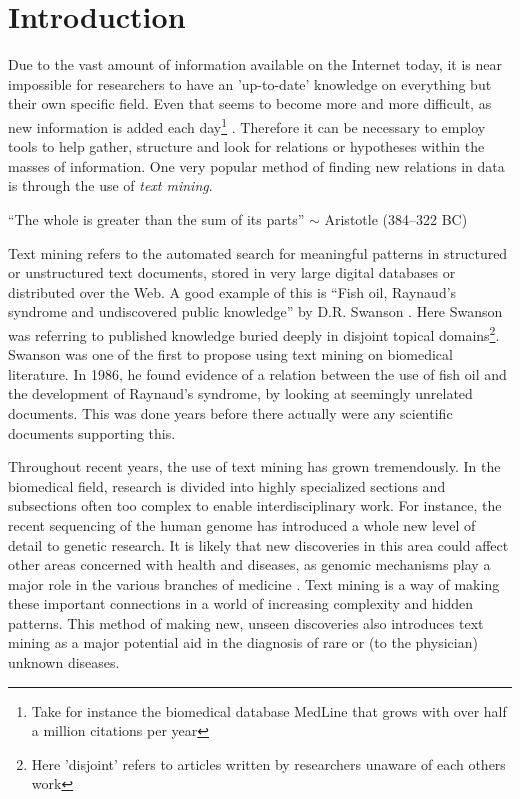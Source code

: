 \chapter{Introduction\label{Introduction}}

Due to the vast amount of information available on the Internet today,
it is near impossible for researchers to have an 'up-to-date'
knowledge on everything but their own specific field. Even that seems
to become more and more difficult, as new information is added each
day\footnote{Take for instance the biomedical database MedLine that
  grows with over half a million citations per year}
\cite{CitAddMedLine}. Therefore it can be necessary to employ tools to
help gather, structure and look for relations or hypotheses within the
masses of information. One very popular method of finding new relations in
data is through the use of \textit{text mining}.

\begin{center}
{\small``The whole is greater than the sum of its parts'' $\sim$ Aristotle
(384--322 BC)} 
\end{center}

Text mining refers to the automated search for meaningful patterns in
structured or unstructured text documents, stored in very large digital
databases or distributed over the Web. A good example of this is
``Fish oil, Raynaud's syndrome and undiscovered public knowledge'' by
D.R. Swanson \cite{DRSwanson}. Here Swanson was referring to published
knowledge buried deeply in disjoint topical domains\footnote{Here
  'disjoint' refers to articles written by researchers unaware of each
  others work}. Swanson was one of the first to propose using text
mining on biomedical literature. In 1986, he found evidence of a
relation between the use of fish oil and the development of Raynaud's
syndrome, by looking at seemingly unrelated documents. This was done
years before there actually were any scientific documents supporting
this.

Throughout recent years, the use of text mining has grown
tremendously. In the biomedical field, research is divided into highly
specialized sections and subsections often too complex to enable
interdisciplinary work. For instance, the recent sequencing of the
human genome has introduced a whole new level of detail to genetic
research. It is likely that new discoveries in this area could affect
other areas concerned with health and diseases, as genomic
mechanisms play a major role in the various branches of medicine
\cite{survey.biomed.text.cohen.2005}. Text mining is a way of making
these important connections in a world of increasing complexity and
hidden patterns. This method of making new, unseen discoveries also
introduces text mining as a major potential aid in the diagnosis of
rare or (to the physician) unknown diseases.

